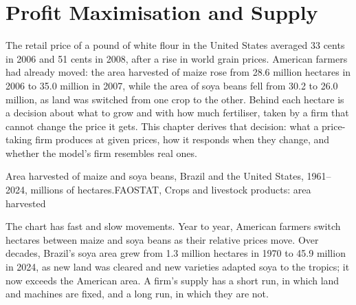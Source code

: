 \chapter{Profit Maximisation and Supply}\label{ch:b1:profit-maximisation}

The retail price of a pound of white flour in the United States averaged
33 cents in 2006 and 51 cents in 2008, after a rise in world grain prices.
American farmers had already moved: the area harvested of maize rose from
28.6 million hectares in 2006 to 35.0 million in 2007, while the area of
soya beans fell from 30.2 to 26.0 million, as land was switched from one
crop to the other. %
Behind each hectare is a decision about what to grow and with how much
fertiliser, taken by a firm that cannot change the price it gets. This
chapter derives that decision: what a price-taking firm produces at given
prices, how it responds when they change, and whether the model's firm
resembles real ones.

\begin{openingchart}{Area harvested of maize and soya beans, Brazil and the
United States, 1961--2024, millions of hectares.}{FAOSTAT, Crops and
livestock products: area harvested}
\end{openingchart}

The chart has fast and slow movements. Year to year, American farmers
switch hectares between maize and soya beans as their relative prices
move. Over decades, Brazil's soya area grew from 1.3 million hectares in
1970 to 45.9 million in 2024, as new land was cleared and new varieties
adapted soya to the tropics; it now exceeds the American
area. %
A firm's supply has a short run, in which land and machines are fixed, and
a long run, in which they are not.

